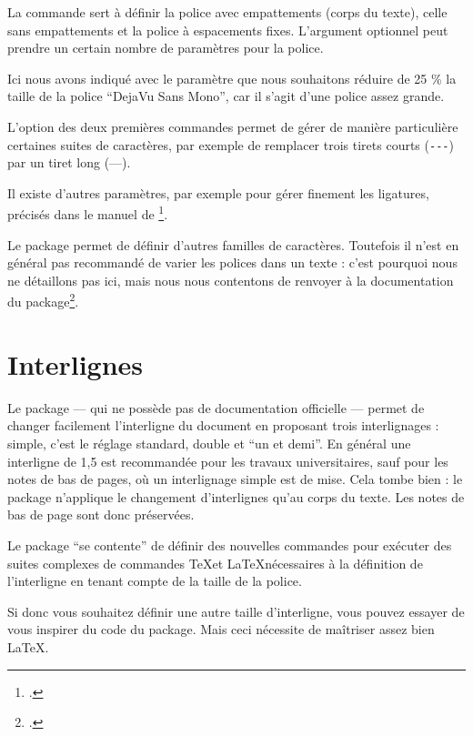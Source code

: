 La commande  sert à définir la police avec empattements (corps du texte),  celle sans empattements et  la police à espacements fixes. L'argument optionnel peut prendre un certain nombre de paramètres pour la police. 

Ici nous avons indiqué avec le paramètre  que nous souhaitons réduire de 25 \% la taille de la police \enquote{DejaVu Sans Mono}, car il s'agit d'une police assez grande. 

L'option  des deux premières commandes permet de gérer de manière particulière certaines suites de caractères, par exemple de remplacer trois tirets courts (\verb|---|) par un tiret long (---). 

Il existe d'autres paramètres, par exemple pour gérer finement les ligatures, précisés dans le manuel de \footcite{fontspec_optionspolices}.

\begin{plusloins}
Le package  permet de définir d'autres familles de caractères. Toutefois  il n'est en général pas recommandé de varier les polices dans un texte : c'est pourquoi nous ne détaillons pas ici, mais nous  nous contentons de renvoyer à la documentation du package\footcite{fontspec_nouvellefamille}.
\end{plusloins}

\section{Interlignes}\label{interligne}

Le package  --- qui ne possède pas de documentation officielle --- permet de changer facilement l'interligne du document en proposant trois interlignages : simple, c'est le réglage standard, double et \enquote{un et demi}. En général une interligne de 1,5 est recommandée pour les travaux universitaires, sauf pour les notes de bas de pages, où un interlignage simple est de mise. Cela tombe bien : le package n'applique le changement d'interlignes qu'au corps du texte. Les notes de bas de page sont donc préservées.

\begin{plusloins}
Le package   \enquote{se contente} de définir des nouvelles commandes pour exécuter des suites complexes de commandes \TeX et \LaTeX nécessaires à la définition de l'interligne en tenant compte de la taille de la police.

Si donc vous souhaitez définir une autre taille d'interligne, vous pouvez essayer de vous inspirer du code du package. Mais ceci nécessite de maîtriser assez bien \LaTeX. 
\end{plusloins}

